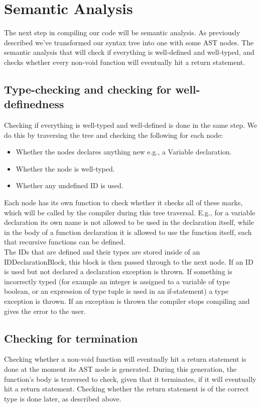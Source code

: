 \documentclass[10pt,a4paper]{article}
\begin{document}
\section{Semantic Analysis}
The next step in compiling our code will be semantic analysis. As previously described we've transformed our syntax tree into one with some AST nodes. The semantic analysis that will check if everything is well-defined and well-typed, and checks whether every non-void function will eventually hit a return statement.\\
\subsection{Type-checking and checking for well-definedness}
Checking if everything is well-typed and well-defined is done in the same step. We do this by traversing the tree and checking the following for each node:
\begin{itemize}
\item Whether the nodes declares anything new e.g., a Variable declaration.
\item Whether the node is well-typed.
\item Whether any undefined ID is used.
\end{itemize}
Each node has its own function to check whether it checks all of these marks, which will be called by the compiler during this tree traversal. E.g., for a variable declaration its own name is not allowed to be used in the declaration itself, while in the body of a function declaration it is allowed to use the function itself, such that recursive functions can be defined.\\
The IDs that are defined and their types are stored inside of an IDDeclarationBlock, this block is then passed through to the next node. If an ID is used but not declared a declaration exception is thrown. If something is incorrectly typed (for example an integer is assigned to a variable of type boolean, or an expression of type tuple is used in an if-statement) a type exception is thrown. If an exception is thrown the compiler stops compiling and gives the error to the user.
\subsection{Checking for termination}
Checking whether a non-void function will eventually hit a return statement is done at the moment its AST node is generated. During this generation, the function's body is traversed to check, given that it terminates, if it will eventually hit a return statement. Checking whether the return statement is of the correct type is done later, as described above.
\end{document}
